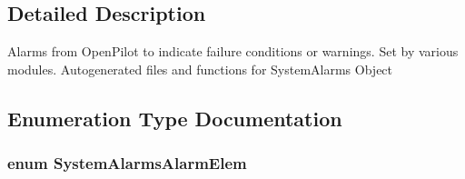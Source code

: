 \subsection{\-Detailed \-Description}
\-Alarms from \-Open\-Pilot to indicate failure conditions or warnings. \-Set by various modules. \-Autogenerated files and functions for \-System\-Alarms \-Object 

\subsection{\-Enumeration \-Type \-Documentation}
\hypertarget{group___system_alarms_ga00a6e22ba79966c55dc043860127ed4d}{
\subsubsection[{\-System\-Alarms\-Alarm\-Elem}]{\setlength{\rightskip}{0pt plus 5cm}enum {\bf \-System\-Alarms\-Alarm\-Elem}}}\label{group___system_alarms_ga00a6e22ba79966c55dc043860127ed4d}
